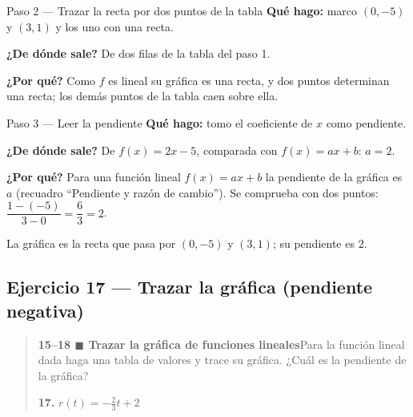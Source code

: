 \documentclass[11pt]{article}
\begin{document}
\begin{paso}{Paso 2 --- Trazar la recta por dos puntos de la tabla}
\textbf{Qué hago:} marco $(0,-5)$ y $(3,1)$ y los uno con una recta.

\textbf{¿De dónde sale?} De dos filas de la tabla del paso 1.

\textbf{¿Por qué?} Como $f$ es lineal su gráfica es una recta, y dos puntos determinan una recta; los demás puntos de la tabla caen sobre ella.
\begin{center}
\end{center}
\end{paso}

\begin{paso}{Paso 3 --- Leer la pendiente}
\textbf{Qué hago:} tomo el coeficiente de $x$ como pendiente.

\textbf{¿De dónde sale?} De $f(x)=2x-5$, comparada con $f(x)=ax+b$: $a=2$.

\textbf{¿Por qué?} Para una función lineal $f(x)=ax+b$ la pendiente de la gráfica es $a$ (recuadro ``Pendiente y razón de cambio''). Se comprueba con dos puntos: $\dfrac{1-(-5)}{3-0}=\dfrac{6}{3}=2$.
\end{paso}

\begin{resp}
La gráfica es la recta que pasa por $(0,-5)$ y $(3,1)$; su pendiente es $2$.
\end{resp}

\subsection*{Ejercicio 17 — Trazar la gráfica (pendiente negativa)}

\begin{quote}
\textbf{15--18 $\blacksquare$ Trazar la gráfica de funciones lineales}\quad Para la función lineal dada haga una tabla de valores y trace su gráfica. ¿Cuál es la pendiente de la gráfica?

\textbf{17.} $r(t)=-\tfrac{2}{3}t+2$
\end{quote}
\end{document}

